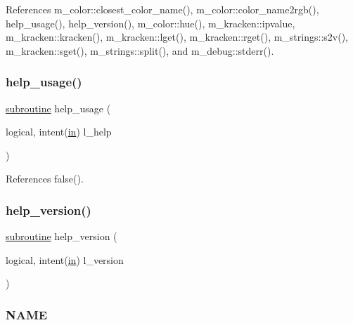 References m\+\_\+color\+::closest\+\_\+color\+\_\+name(), m\+\_\+color\+::color\+\_\+name2rgb(), help\+\_\+usage(), help\+\_\+version(), m\+\_\+color\+::hue(), m\+\_\+kracken\+::ipvalue, m\+\_\+kracken\+::kracken(), m\+\_\+kracken\+::lget(), m\+\_\+kracken\+::rget(), m\+\_\+strings\+::s2v(), m\+\_\+kracken\+::sget(), m\+\_\+strings\+::split(), and m\+\_\+debug\+::stderr().

\mbox{\label{colors_8f90_a3e09a3b52ee8fb04eeb93fe5761626a8}} 
\subsubsection{\texorpdfstring{help\+\_\+usage()}{help\_usage()}}
{\footnotesize\ttfamily \hyperlink{M__stopwatch_83_8txt_acfbcff50169d691ff02d4a123ed70482}{subroutine} help\+\_\+usage (\begin{DoxyParamCaption}\item[{logical, intent(\hyperlink{M__journal_83_8txt_afce72651d1eed785a2132bee863b2f38}{in})}]{l\+\_\+help }\end{DoxyParamCaption})}



References false().

\mbox{\label{colors_8f90_a39c21619b08a3c22f19e2306efd7f766}} 
\subsubsection{\texorpdfstring{help\+\_\+version()}{help\_version()}}
{\footnotesize\ttfamily \hyperlink{M__stopwatch_83_8txt_acfbcff50169d691ff02d4a123ed70482}{subroutine} help\+\_\+version (\begin{DoxyParamCaption}\item[{logical, intent(\hyperlink{M__journal_83_8txt_afce72651d1eed785a2132bee863b2f38}{in})}]{l\+\_\+version }\end{DoxyParamCaption})}



\subsubsection*{N\+A\+ME}

